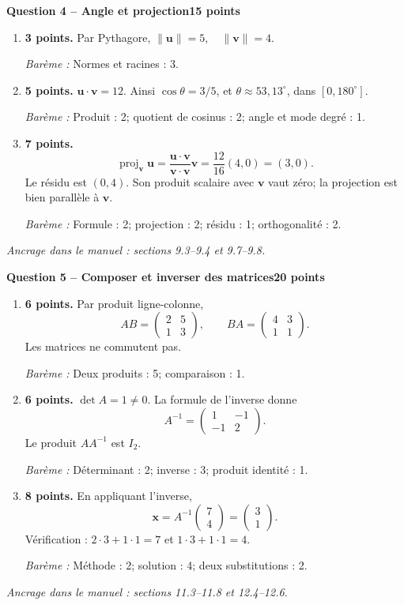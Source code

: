 \documentclass[11pt,a4paper]{article}
\begin{document}
\newpage
{\large\bfseries Question 4 -- Angle et projection}\hfill\textbf{15 points}\par
\begin{enumerate}
\item \textbf{3 points.} Par Pythagore, \(\|\mathbf u\|=5,\quad\|\mathbf v\|=4\).
\par{\small\textit{Barème : }Normes et racines : 3.}
\item \textbf{5 points.} \(\mathbf u\cdot\mathbf v=12\). Ainsi \(\cos\theta=3/5\), et \(\theta\approx 53{,}13^\circ\), dans \([0,180^\circ]\).
\par{\small\textit{Barème : }Produit : 2; quotient de cosinus : 2; angle et mode degré : 1.}
\item \textbf{7 points.} \[\operatorname{proj}_{\mathbf v}\mathbf u=\frac{\mathbf u\cdot\mathbf v}{\mathbf v\cdot\mathbf v}\mathbf v=\frac{12}{16}(4,0)=(3,0).\] Le résidu est \((0,4)\). Son produit scalaire avec \(\mathbf v\) vaut zéro; la projection est bien parallèle à \(\mathbf v\).
\par{\small\textit{Barème : }Formule : 2; projection : 2; résidu : 1; orthogonalité : 2.}
\end{enumerate}
\vfill {\small\textit{Ancrage dans le manuel : sections 9.3--9.4 et 9.7--9.8.}}

\newpage
{\large\bfseries Question 5 -- Composer et inverser des matrices}\hfill\textbf{20 points}\par
\begin{enumerate}
\item \textbf{6 points.} Par produit ligne-colonne, \[AB=\begin{pmatrix}2 & 5\\1 & 3\end{pmatrix},\qquad BA=\begin{pmatrix}4 & 3\\1 & 1\end{pmatrix}.\] Les matrices ne commutent pas.
\par{\small\textit{Barème : }Deux produits : 5; comparaison : 1.}
\item \textbf{6 points.} \(\det A=1\ne0\). La formule de l’inverse donne \[A^{-1}=\begin{pmatrix}1 & -1\\-1 & 2\end{pmatrix}.\] Le produit \(AA^{-1}\) est \(I_2\).
\par{\small\textit{Barème : }Déterminant : 2; inverse : 3; produit identité : 1.}
\item \textbf{8 points.} En appliquant l’inverse, \[\mathbf x=A^{-1}\begin{pmatrix}7\\4\end{pmatrix}=\begin{pmatrix}3\\1\end{pmatrix}.\] Vérification : \(2\cdot3+1\cdot1=7\) et \(1\cdot3+1\cdot1=4\).
\par{\small\textit{Barème : }Méthode : 2; solution : 4; deux substitutions : 2.}
\end{enumerate}
\vfill {\small\textit{Ancrage dans le manuel : sections 11.3--11.8 et 12.4--12.6.}}
\end{document}
